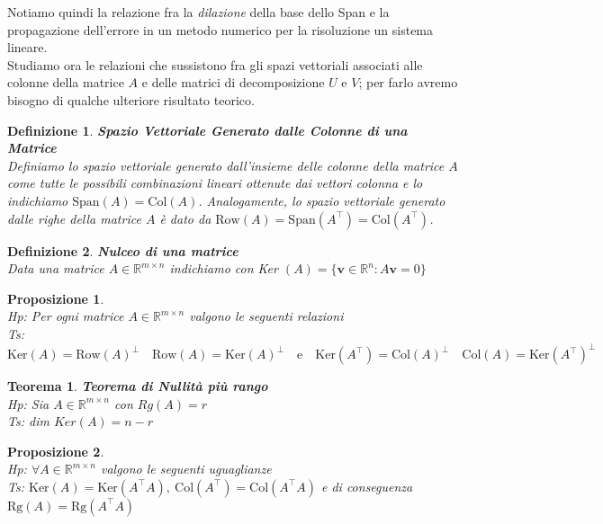 \documentclass[11pt]{article}
\newtheorem{proposition}{Proposizione}
\newtheorem{theorem}{Teorema}
\newtheorem{definition}{Definizione}
\newcommand{\R}{\mathbb{R}}
\begin{document}
Notiamo quindi la relazione fra la \textit{dilazione} della base dello Span e la propagazione dell'errore in un metodo numerico per la risoluzione un sistema lineare. \\
Studiamo ora le relazioni che sussistono fra gli spazi vettoriali associati alle colonne della matrice $A$ e delle matrici di decomposizione $U$ e $V$; per farlo avremo bisogno di qualche ulteriore risultato teorico.
\begin{definition} \textbf{Spazio Vettoriale Generato dalle Colonne di una Matrice}\\
Definiamo lo spazio vettoriale generato dall'insieme delle colonne della matrice \(A\) come tutte le possibili combinazioni lineari ottenute dai vettori colonna e lo indichiamo \(\text{Span}(A) = \text{Col}(A)\). Analogamente, lo spazio vettoriale generato dalle righe della matrice \(A\) è dato da \(\text{Row}(A) = \text{Span}(A^\top) = \text{Col}(A^\top) \).
\end{definition}
\begin{definition}\textbf{Nulceo di una matrice}\\
Data una matrice \(A \in \R^{m \times n} \) indichiamo con Ker \((A)= \{ \mathbf{v} \in \R^n: A\mathbf{v}=0 \}\) 
\end{definition}
\begin{proposition}
\textbf{}\\
\textit{Hp:} Per ogni matrice $A \in \R^{m \times n}$ valgono le seguenti relazioni\\
\textit{Ts:} $ \text{Ker}(A)=\text{Row}(A)^\perp \quad \text{Row}(A)=\text{Ker}(A)^\perp \quad \text{e} \quad \text{Ker}(A^\top)=\text{Col}(A)^\perp \quad \text{Col}(A)=\text{Ker}(A^\top)^\perp $ 
\end{proposition}
\begin{theorem}\label{null}
\textbf{Teorema di Nullità più rango}\\
\textit{Hp:} Sia $A\in \R^{m \times n}$ con \(Rg(A)=r\)\\
\textit{Ts:} dim \(Ker(A)=n-r\)
\end{theorem}
\begin{proposition}\label{prop gal}
\textbf{}\\
\textit{Hp:} $\forall A \in \R^{m \times n}$ valgono le seguenti uguaglianze\\
\textit{Ts:} $\text{Ker}(A)=\text{Ker}(A^\top      A),\ \text{Col}(A^\top      )=\text{Col}(A^\top      A)$ e di conseguenza $\text{Rg}(A)=\text{Rg}(A^\top      A)$
\end{proposition}
\end{document}
